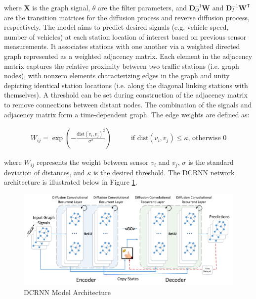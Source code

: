\documentclass{article}
\begin{document}
where $\mathbf{X}$ is the graph signal, $\theta$ are the filter parameters, and $\mathbf{D}_O^{-1}\mathbf{W}$ and $\mathbf{D}_I^{-1}\mathbf{W}^\mathsf{T}$ are the transition matrices for the diffusion process and reverse diffusion process, respectively. The model aims to predict desired signals (e.g. vehicle speed, number of vehicles) at each station location of interest based on previous sensor measurements. It associates stations with one another via a weighted directed graph represented as a weighted adjacency matrix. Each element in the adjacency matrix captures the relative proximity between two traffic stations (i.e. graph nodes), with nonzero elements characterizing edges in the graph and unity depicting identical station locations (i.e. along the diagonal linking stations with themselves). A threshold can be set during construction of the adjacency matrix to remove connections between distant nodes. The combination of the signals and adjacency matrix form a time-dependent graph. The edge weights are defined as:

\begin{equation}
    \begin{split}
        W_{ij}=\exp\left(-\frac{\text{dist}(v_i,v_j)^2}{\sigma^2}\right)
    \end{split}
    \qquad
    \begin{split}
        \text{if dist}(v_i,v_j)\leq\kappa\text{, otherwise }0
    \end{split}
\end{equation}

where $W_{ij}$ represents the weight between sensor $v_i$ and $v_j$, $\sigma$ is the standard deviation of distances, and $\kappa$ is the desired threshold. The DCRNN network architecture is illustrated below in Figure \ref{fig:dcrnn-architecture}.

\begin{figure}[hbt!]
	\centering
	\includegraphics[width=\textwidth]{images/dcrnn_model_architecture.jpeg}
	\caption{DCRNN Model Architecture \cite{li2018dcrnn_traffic}}
	\label{fig:dcrnn-architecture}
\end{figure}
\end{document}
